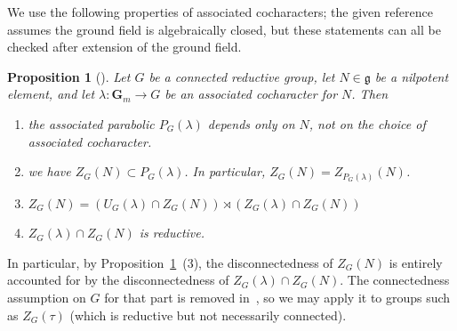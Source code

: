 \documentclass{amsart}
\renewcommand{\mathbb}{\mathbf}
\newtheorem{prop}[subsubsection]{Proposition}
\theoremstyle{definition}
\theoremstyle{remark}
\newcommand{\mar}[1]{}
\newcommand{\mar}[1]{\marginpar{\raggedright\tiny squirrel #1}}
\newcommand{\GG}{{\mathbb G}}
\newcommand{\Gm}{\GG_m}
\begin{document}
We use the following properties of associated cocharacters; the given
reference assumes the ground field is algebraically closed, but these
statements can all be checked after extension of the ground field.
\begin{prop}[{\cite[5.9,5.10,5.11]{jantzen}}]\label{prop: associated
    cochar facts} %
Let $G$ be a connected reductive group, let $N\in\mathfrak{g}$ be a nilpotent element, and let $\lambda:\Gm\rightarrow G$ be an associated cocharacter for $N$.  Then
\begin{enumerate}
\item	the associated parabolic $P_G(\lambda)$ depends only on $N$, not on the choice of associated cocharacter.
\item	we have $Z_G(N)\subset P_G(\lambda)$.  In particular,
  $Z_G(N)=Z_{P_G(\lambda)}(N)$.%
\item	$Z_G(N)=\left(U_G(\lambda)\cap Z_G(N)\right)\rtimes\left(Z_G(\lambda)\cap Z_G(N)\right)$
\item	$Z_G(\lambda)\cap Z_G(N)$ is reductive.
\end{enumerate}
\end{prop}


In particular, by Proposition~\ref{prop: associated
    cochar facts}~(3), the disconnectedness of $Z_G(N)$ is entirely accounted for by the disconnectedness of $Z_G(\lambda)\cap Z_G(N)$.  The connectedness assumption on $G$ for that part is removed in~\cite[Proposition 4.9]{2014arXiv1403.1411B}, so we may apply it to groups such as $Z_G(\tau)$ (which is reductive but not necessarily connected).%
\end{document}

